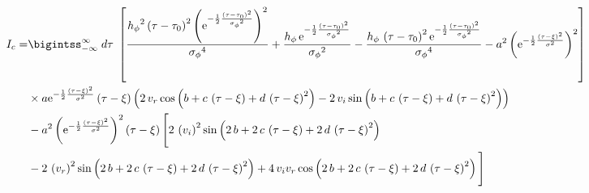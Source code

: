 \begin{landscape}
\begin{align}
I_c  =& \bigintss_{-\infty}^{\infty} \; d\tau\; \left[ \frac{{{ h_{\phi}}}^{2} \left( \tau-{ \tau_0} \right) ^{2} \left( {
{\rm e}^{-\frac{1}{2}{\frac { \left( \tau-{ \tau_0} \right) ^{2}}{{{ 
\sigma_{\phi}}}^{2}}}}} \right) ^{2}}{{{ \sigma_{\phi}}}^{4}}+\frac{{ h_{\phi}}
\,{{\rm e}^{-\frac{1}{2}{\frac { \left( \tau-{ \tau_0} \right) ^{2}}{{{ 
\sigma_{\phi}}}^{2}}}}}}{{{ \sigma_{\phi}}}^{2}}-\frac{{ h_{\phi}}\, \left( \tau-{
 \tau_0} \right) ^{2}{{\rm e}^{-\frac{1}{2}{\frac { \left( \tau-{ \tau_0}
 \right) ^{2}}{{{ \sigma_{\phi}}}^{2}}}}}}{{{ \sigma_{\phi}}}^{4}}-{a}^{
2} \left( {{\rm e}^{-\frac{1}{2}{\frac { \left( \tau-\xi \right) ^{2}}{{
\sigma}^{2}}}}} \right) ^{2} \right] \nonumber \\
&\times a{{\rm e}^{-\frac{1}{2}{\frac { \left( 
\tau-\xi \right) ^{2}}{{\sigma}^{2}}}}} \left( \tau-\xi \right) 
 \left( 2\,v_r\cos \left( b+c\,
 \left( \tau-\xi \right) +d\, \left( \tau-\xi \right) ^{2}
 \right) -2\,v_i \sin \left( b+c\,
 \left( \tau-\xi \right) +d\, \left( \tau-\xi \right) ^{2}
 \right)  \right) \nonumber \\
 &-{a}^{2} \left( {{\rm e}^{-\frac{1}{2}{\frac { \left( \tau-{
 \xi} \right) ^{2}}{{\sigma}^{2}}}}} \right) ^{2} \left( \tau-\xi
 \right)  \Bigg[ 2\, \left( v_i 
 \right) ^{2}\sin \left( 2\,b+2\,c\, \left( \tau-\xi \right) +2\,d\,
 \left( \tau-\xi \right) ^{2} \right) \nonumber \\
 &-2\, \left( v_r  \right) ^{2}\sin \left( 2\,b+2\,c\, \left( \tau-{ \xi
} \right) +2\,d\, \left( \tau-\xi \right) ^{2} \right) +4\,v_i v_r \cos
 \left( 2\,b+2\,c\, \left( \tau-\xi \right) +2\,d\, \left( \tau-{ \xi
} \right) ^{2} \right)  \Bigg] 
\end{align}


\end{landscape}
